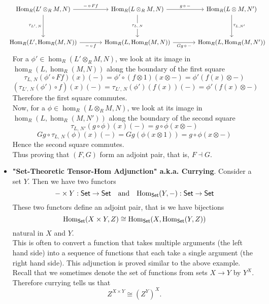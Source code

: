 \begin{example}
\begin{itemize}[itemsep=1em]
\[\hspace*{-1em}\begin{tikzcd}[column sep = scriptsize]
{\hom_R(L' \otimes_R M,N)} \arrow[rr, "{-\,\circ\, Ff}"] \arrow[dd, "{\tau_{L',\,N}}"'] &  & {\hom_R(L\otimes_R M,N)} \arrow[rr, "{g\,\circ\,-}"] \arrow[dd, "{\tau_{L,\,N}}" description] &  & {\hom_R(L\otimes M,N')} \arrow[dd, "{\tau_{L,N'}}"] \\
                                                                                     &  &                                                                                             &  &                                                     \\
{\hom_R(L',\hom_R(M,N))} \arrow[rr, "{-\,\circ\, f}"']                               &  & {\hom_R(L,\hom_R(M,N))} \arrow[rr, "{Gg\,\circ\,-}"']                                       &  & {\hom_R(L,\hom_R(M,N'))}                           
\end{tikzcd}\]
For a $\phi' \in \hom_R(L' \otimes_R M,N)$, we look at its image in $\hom_R(L,\hom_R(M,N))$ along the boundary of the first square
\[\tau_{L,\,N}(\phi'\circ Ff)(x)(-) = \phi'\circ(f\otimes 1)(x\otimes -) = \phi'(f(x)\otimes -)\]
\[(\tau_{L',\,N}(\phi')\circ f)(x)(-) = \tau_{L',\,N}(\phi')(f(x))(-) = \phi'(f(x)\otimes -)\]
Therefore the first square commutes.\\[1em]
Now, for a $\phi \in \hom_R(L \otimes_R M,N)$, we look at its image in $\hom_R(L,\hom_R(M,N'))$ along the boundary of the second square
\[\tau_{L,\,N'}(g\circ \phi)(x)(-) = g\circ\phi(x\otimes -)\]
\[Gg \circ \tau_{L,\,N}(\phi)(x)(-) = Gg(\phi(x\otimes 1)) = g\circ \phi(x\otimes -)\]
Hence the second square commutes.\\[1em]
Thus proving that $(F,G)$ form an adjoint pair, that is, $F\dashv G$.
\item \textbf{"Set-Theoretic Tensor-Hom Adjunction" a.k.a. Currying}. Consider a set $Y$. Then we have two functors
\[- \times Y:\mathsf{Set} \to \mathsf{Set} \quad \text{and} \quad \mathrm{Hom}_{\mathsf{Set}}(Y,-):\mathsf{Set} \to \mathsf{Set}\]
These two functors define an adjoint pair, that is we have bijections
\[\mathrm{Hom}_{\mathsf{Set}}(X\times Y,Z) \cong \mathrm{Hom}_{\mathsf{Set}}(X,\mathrm{Hom}_{\mathsf{Set}}(Y,Z))\]
natural in $X$ and $Y$.\\[1em]
This is often to convert a function that takes multiple arguments (the left hand side) into a sequence of functions that each take a single argument (the right hand side). This adjunction is proved similar to the above example.\\[1em]
Recall that we sometimes denote the set of functions from sets $X \to Y$ by $Y^X$. Therefore currying tells us that \[Z^{X\times Y} \cong (Z^Y)^X.\]


\end{itemize}
\end{example}
